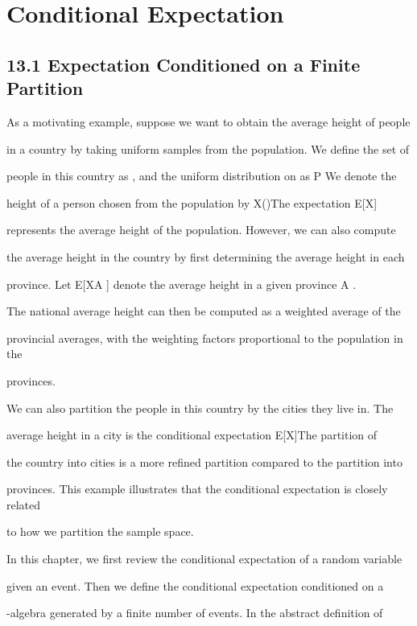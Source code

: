 \section*{Conditional Expectation}

\subsection*{13.1 Expectation Conditioned on a Finite Partition}

As a motivating example, suppose we want to obtain the average height of people

in a country by taking uniform samples from the population. We define the set of

people in this country as \Omega , and the uniform distribution on \Omega as P We denote the

height of a person chosen from the population by X()The expectation E[X]

represents the average height of the population. However, we can also compute

the average height in the country by first determining the average height in each

province. Let E[X\vertprovince A ] denote the average height in a given province A .

The national average height can then be computed as a weighted average of the

provincial averages, with the weighting factors proportional to the population in the

provinces.

We can also partition the people in this country by the cities they live in. The

average height in a city is the conditional expectation E[X\vertcity ]The partition of

the country into cities is a more refined partition compared to the partition into

provinces. This example illustrates that the conditional expectation is closely related

to how we partition the sample space.

In this chapter, we first review the conditional expectation of a random variable

given an event. Then we define the conditional expectation conditioned on a

\sigma-algebra generated by a finite number of events. In the abstract definition of


